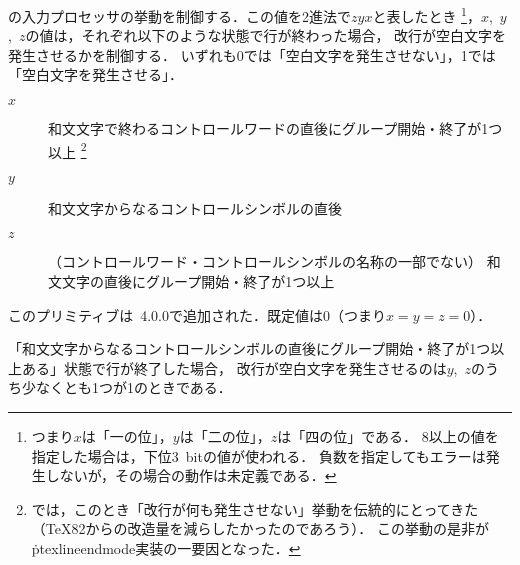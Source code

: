 \documentclass[a4paper,11pt,nomag,dvipdfmx]{jsarticle}
\begin{document}
\begin{cslist}
  \csitem[\.{ptexlineendmode}=<0--7>]
  \pTeX の入力プロセッサの挙動を制御する．この値を2進法で$zyx$と表したとき
  \footnote{%
    つまり$x$は「一の位」，$y$は「二の位」，$z$は「四の位」である．
    8以上の値を指定した場合は，下位3~bitの値が使われる．
    負数を指定してもエラーは発生しないが，その場合の動作は未定義である．
  }，$x$,~$y$,~$z$の値は，それぞれ以下のような状態で行が終わった場合，
  改行が空白文字を発生させるかを制御する．
  いずれも0では「空白文字を発生させない」，1では「空白文字を発生させる」．
  \begin{description}
    \item[$x$] 和文文字で終わるコントロールワードの直後にグループ開始・終了が1つ以上
    \footnote{%
      \pTeX では，このとき「改行が何も発生させない」挙動を伝統的にとってきた
      （\TeX82からの改造量を減らしたかったのであろう）．
      この挙動の是非が\.{ptexlineendmode}実装の一要因となった．
    }
    \item[$y$] 和文文字からなるコントロールシンボルの直後
    \item[$z$] （コントロールワード・コントロールシンボルの名称の一部でない）
    和文文字の直後にグループ開始・終了が1つ以上
  \end{description}

  このプリミティブは\pTeX~4.0.0で追加された．既定値は0（つまり$x=y=z=0$）．
\end{cslist}
\begin{dangerous}
  「和文文字からなるコントロールシンボルの直後にグループ開始・終了が1つ以上ある」状態で行が終了した場合，
  改行が空白文字を発生させるのは$y$,~$z$のうち少なくとも1つが1のときである．
\end{dangerous}
\end{document}
